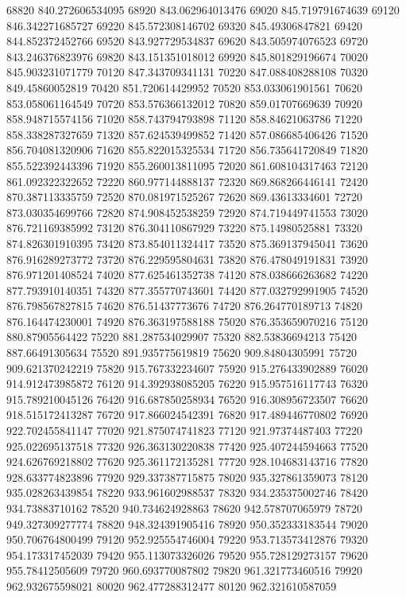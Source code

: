 {68820 840.272606534095
68920 843.062964013476
69020 845.719791674639
69120 846.342271685727
69220 845.572308146702
69320 845.49306847821
69420 844.852372452766
69520 843.927729534837
69620 843.505974076523
69720 843.246376823976
69820 843.151351018012
69920 845.801829196674
70020 845.903231071779
70120 847.343709341131
70220 847.088408288108
70320 849.45860052819
70420 851.720614429952
70520 853.033061901561
70620 853.058061164549
70720 853.576366132012
70820 859.01707669639
70920 858.948715574156
71020 858.743794793898
71120 858.84621063786
71220 858.338287327659
71320 857.624539499852
71420 857.086685406426
71520 856.704081320906
71620 855.822015325534
71720 856.735641720849
71820 855.522392443396
71920 855.260013811095
72020 861.608104317463
72120 861.092322322652
72220 860.977144888137
72320 869.868266446141
72420 870.387113335759
72520 870.081971525267
72620 869.43613334601
72720 873.030354699766
72820 874.908452538259
72920 874.719449741553
73020 876.721169385992
73120 876.304110867929
73220 875.14980525881
73320 874.826301910395
73420 873.854011324417
73520 875.369137945041
73620 876.916289273772
73720 876.229595804631
73820 876.478049191831
73920 876.971201408524
74020 877.625461352738
74120 878.038666263682
74220 877.793910140351
74320 877.355770743601
74420 877.032792991905
74520 876.798567827815
74620 876.51437773676
74720 876.264770189713
74820 876.164474230001
74920 876.363197588188
75020 876.353659070216
75120 880.87905564422
75220 881.287534029907
75320 882.53836694213
75420 887.66491305634
75520 891.935775619819
75620 909.84804305991
75720 909.621370242219
75820 915.767332234607
75920 915.276433902889
76020 914.912473985872
76120 914.392938085205
76220 915.957516117743
76320 915.789210045126
76420 916.687850258934
76520 916.308956723507
76620 918.515172413287
76720 917.866024542391
76820 917.489446770802
76920 922.702455841147
77020 921.875074741823
77120 921.97374487403
77220 925.022695137518
77320 926.363130220838
77420 925.407244594663
77520 924.626769218802
77620 925.361172135281
77720 928.104683143716
77820 928.633774823896
77920 929.337387715875
78020 935.327861359073
78120 935.028263439854
78220 933.961602988537
78320 934.235375002746
78420 934.73883710162
78520 940.734624928863
78620 942.578707065979
78720 949.327309277774
78820 948.324391905416
78920 950.352333183544
79020 950.706764800499
79120 952.925554746004
79220 953.713573412876
79320 954.173317452039
79420 955.113073326026
79520 955.728129273157
79620 955.78412505609
79720 960.693770087802
79820 961.321773460516
79920 962.932675598021
80020 962.477288312477
80120 962.321610587059
}
